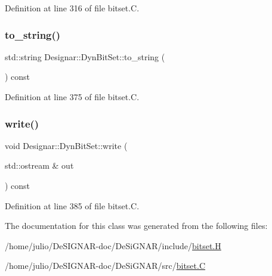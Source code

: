 Definition at line 316 of file bitset.\+C.

\mbox{\label{class_designar_1_1_dyn_bit_set_ad393d0c9a7f15f022b0529fbe2983780}} 
\subsubsection{\texorpdfstring{to\+\_\+string()}{to\_string()}}
{\footnotesize\ttfamily std\+::string Designar\+::\+Dyn\+Bit\+Set\+::to\+\_\+string (\begin{DoxyParamCaption}{ }\end{DoxyParamCaption}) const}



Definition at line 375 of file bitset.\+C.

\mbox{\label{class_designar_1_1_dyn_bit_set_ac04df606a53e544d8e87d931be0abac0}} 
\subsubsection{\texorpdfstring{write()}{write()}}
{\footnotesize\ttfamily void Designar\+::\+Dyn\+Bit\+Set\+::write (\begin{DoxyParamCaption}\item[{std\+::ostream \&}]{out }\end{DoxyParamCaption}) const}



Definition at line 385 of file bitset.\+C.



The documentation for this class was generated from the following files\+:\begin{DoxyCompactItemize}
\item 
/home/julio/\+De\+S\+I\+G\+N\+A\+R-\/doc/\+De\+Si\+G\+N\+A\+R/include/\hyperlink{bitset_8_h}{bitset.\+H}\item 
/home/julio/\+De\+S\+I\+G\+N\+A\+R-\/doc/\+De\+Si\+G\+N\+A\+R/src/\hyperlink{bitset_8_c}{bitset.\+C}\end{DoxyCompactItemize}
